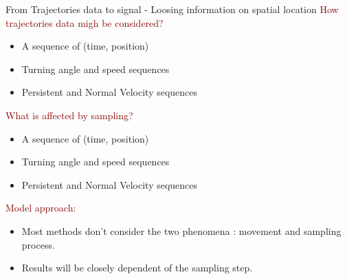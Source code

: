 \documentclass{beamer}\usepackage[]{graphicx}\usepackage[]{color}
\newcommand{\emphase}[1]{\textcolor{darkred}{#1}}
\newcommand{\paragraph}[1]{\emphase{#1}}
\begin{document}
\begin{frame}{From Trajectories data to signal - Loosing information on spatial location}
\paragraph{How trajectories data migh be considered?}
\begin{itemize}
\item A sequence of (time, position)
\item Turning angle and speed sequences
\item Persistent and Normal Velocity sequences
\end{itemize}
\pause
\paragraph{What is affected by sampling?}
\begin{itemize}
\item A sequence of (time, position)
\item Turning angle and speed sequences
\item Persistent and Normal Velocity sequences
\end{itemize}
\pause
\paragraph{Model approach:}
\begin{itemize}
\item Most methods don't consider the two phenomena : movement and sampling process.
  \item Results will be closely dependent of the sampling step.
  \end{itemize}
\end{frame}
\end{document}
